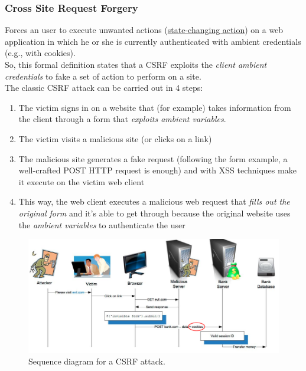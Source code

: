 \documentclass{article}
\begin{document}
				\subsubsection{Cross Site Request Forgery}
					Forces an user to execute unwanted actions (\underline{state-changing action}) on a web application in which he or she is currently authenticated with ambient credentials (e.g., with cookies).\\
					So, this formal definition states that a CSRF exploits the \emph{client ambient credentials} to fake a set of action to perform on a site.\\
					The classic CSRF attack can be carried out in 4 steps:
					\begin{enumerate}
						\item The victim signs in on a website that (for example) takes information from the client through a form that \emph{exploits ambient variables}.
						\item The victim visits a malicious site (or clicks on a link)
						\item The malicious site generates a fake request (following the form example, a well-crafted POST HTTP request is enough) and with XSS techniques make it execute on the victim web client
						\item This way, the web client executes a malicious web request that \emph{fills out the original form} and it's able to get through because the original website uses the \emph{ambient variables} to authenticate the user
					\end{enumerate}
					
					\begin{figure}[H]
						\centering
						\includegraphics[width = \textwidth]{./images/CSRF1.png}
						\caption{Sequence diagram for a CSRF attack.}
					\end{figure}
					
\end{document}
